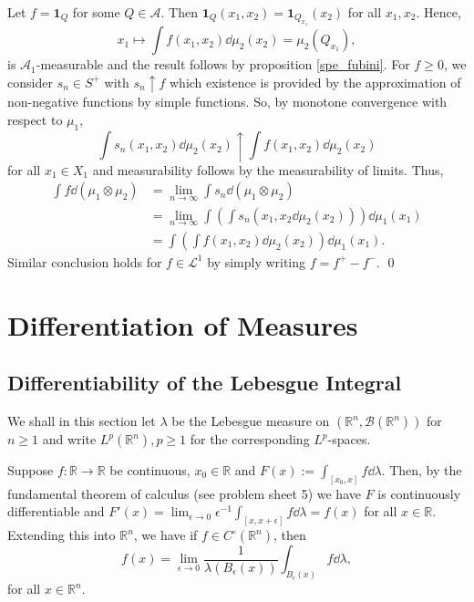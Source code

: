 \documentclass[
]{article}
\theoremstyle{definition}
\theoremstyle{definition}
\begin{document}
Let \(f = \mathbf{1}_Q\) for some \(Q \in \mathcal{A}\). Then
\(\mathbf{1}_Q(x_1, x_2) = \mathbf{1}_{Q_{x_1}}(x_2)\) for all
\(x_1, x_2\). Hence,
\[x_1 \mapsto \int f(x_1, x_2) \dd\mu_2(x_2) = \mu_2(Q_{x_1}),\] is
\(\mathcal{A}_1\)-measurable and the result follows by proposition
\ref{spe_fubini}. For \(f \ge 0\), we consider \(s_n \in S^+\) with
\(s_n \uparrow f\) which existence is provided by the approximation of
non-negative functions by simple functions. So, by monotone convergence
with respect to \(\mu_1\),
\[\int s_n(x_1, x_2) \dd \mu_2(x_2) \uparrow \int f(x_1, x_2) \dd \mu_2(x_2)\]
for all \(x_1 \in X_1\) and measurability follows by the measurability
of limits. Thus, \[\begin{split}
    \int f \dd (\mu_1 \otimes \mu_2) & = \lim_{n \to \infty} \int s_n \dd (\mu_1 \otimes \mu_2)\\
      & = \lim_{n \to \infty} \int \left(\int s_n(x_1, x_2 \dd\mu_2(x_2)) \right) \dd \mu_1(x_1)\\
      & = \int\left(\int f(x_1, x_2) \dd\mu_2(x_2)\right)\dd \mu_1(x_1).
  \end{split}\] Similar conclusion holds for \(f \in \mathcal{L}^1\) by
simply writing \(f = f^+ - f^-\). \qed

\newpage

\hypertarget{differentiation-of-measures}{%
\section{Differentiation of
Measures}\label{differentiation-of-measures}}

\hypertarget{differentiability-of-the-lebesgue-integral}{%
\subsection{Differentiability of the Lebesgue
Integral}\label{differentiability-of-the-lebesgue-integral}}

We shall in this section let \(\lambda\) be the Lebesgue measure on
\((\mathbb{R}^n, \mathcal{B}(\mathbb{R}^n))\) for \(n \ge 1\) and write
\(L^p(\mathbb{R}^n), p \ge 1\) for the corresponding \(L^p\)-spaces.

Suppose \(f : \mathbb{R} \to \mathbb{R}\) be continuous,
\(x_0 \in \mathbb{R}\) and \(F(x) := \int_{[x_0, x]} f \dd \lambda\).
Then, by the fundamental theorem of calculus (see problem sheet 5) we
have \(F\) is continuously differentiable and
\(F'(x) = \lim_{\epsilon \to 0} \epsilon^{-1} \int_{[x, x + \epsilon]} f \dd \lambda = f(x)\)
for all \(x \in \mathbb{R}\). Extending this into \(\mathbb{R}^n\), we
have if \(f \in C^\circ(\mathbb{R}^n)\), then
\[f(x) = \lim_{\epsilon \to 0} \frac{1}{\lambda(B_\epsilon(x))} \int_{B_\epsilon(x)} f \dd \lambda,\]
for all \(x \in \mathbb{R}^n\).
\end{document}
